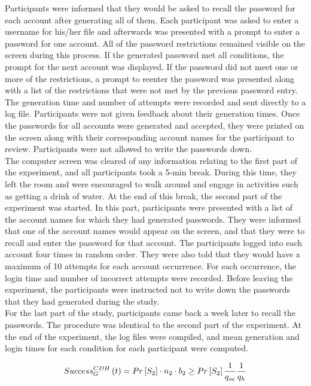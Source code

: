 \documentclass[fleqn]{Paquetes/RevDigMatEduInt}
\begin{document}
Participants were informed that they would be asked to recall the password for each account after generating all of them. Each participant was asked to enter a username for his/her file and afterwards was presented with a prompt to enter a password for one account. All of the password restrictions remained visible on the screen during this process. If the generated password met all conditions, the prompt for the next account was displayed. If the password did not meet one or more of the restrictions, a prompt to reenter the password was presented along with a list of the restrictions that were not met by the previous password entry. The generation time and number of attempts were recorded and sent directly to a log file. Participants were not given feedback about their generation times. Once the passwords for all accounts were generated and accepted, they were printed on the screen along with their corresponding account names for the participant to review. Participants were not allowed to write the passwords down. \\
The computer screen was cleared of any information relating to the first part of the experiment, and all participants took a 5-min break. During this time, they left the room and were encouraged to walk around and engage in activities such as getting a drink of water. At the end of this break, the second part of the experiment was started. In this part, participants were presented with a list of the account names for which they had generated passwords. They were informed that one of the account names would appear on the screen, and that they were to recall and enter the password for that account. The participants logged into each account four times in random order. They were also told that they would have a maximum of 10 attempts for each account occurrence. For each occurrence, the login time and number of incorrect attempts were recorded. Before leaving the experiment, the participants were instructed not to write down the passwords that they had generated during the study. \\
For the last part of the study, participants came back a week later to recall the passwords. The procedure was identical to the second part of the experiment. At the end of the experiment, the log files were compiled, and mean generation and login times for each condition for each participant were computed.

\begin{equation}
    \centering
	Success_{G}^{CDH} \left(t\right) = Pr\left[S_{2}\right] \cdot n_{2} \cdot b_{2} \ge Pr\left[S_{2}\right]  \frac{1}{q_{se}} \frac{1}{q_{h}}
	\label{eqn:03}
\end{equation}
\end{document}
